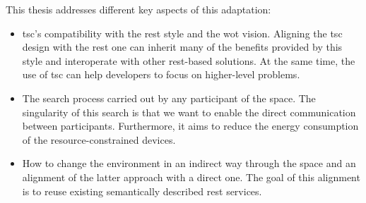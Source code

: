 This thesis addresses different key aspects of this adaptation:
\begin{itemize}
  \item \ac{tsc}'s compatibility with the \acs{rest} style and the \ac{wot} vision.
	Aligning the \ac{tsc} design with the \ac{rest} one can inherit many of the benefits provided by this style and interoperate with other \ac{rest}-based solutions.
	At the same time, the use of \ac{tsc} can help developers to focus on higher-level problems.
  \item The search process carried out by any participant of the space.
	The singularity of this search is that we want to enable the direct communication between participants.
	Furthermore, it aims to reduce the energy consumption of the resource-constrained devices.
  \item How to change the environment in an indirect way through the space and an alignment of the latter approach with a direct one.
	The goal of this alignment is to reuse existing semantically described \ac{rest} services.
\end{itemize}
